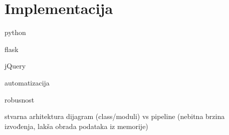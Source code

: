 \chapter{Implementacija}
\label{chap:implementacija}

python

flask

jQuery

automatizacija

robusnost

stvarna arhitektura dijagram (class/moduli)
vs pipeline (nebitna brzina izvođenja, lakša obrada podataka iz memorije)
